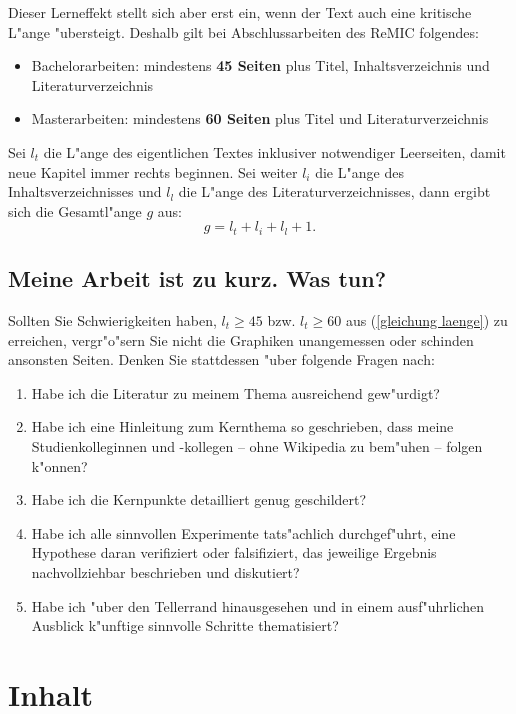 \documentclass[12pt,a4paper,headinclude,twoside, plainheadsepline, open=right,numbers=noenddot]{scrreprt}
\begin{document}
Dieser Lerneffekt stellt sich aber erst ein, wenn der Text auch eine kritische L"ange "ubersteigt.
Deshalb gilt bei Abschlussarbeiten des ReMIC folgendes:
\begin{itemize}
\item Bachelorarbeiten: mindestens \textbf{45 Seiten} plus Titel, Inhaltsverzeichnis und Literaturverzeichnis
\item Masterarbeiten: mindestens \textbf{60 Seiten} plus Titel und Literaturverzeichnis
\end{itemize}
Sei $l_t$ die L"ange des eigentlichen Textes inklusiver notwendiger Leerseiten, damit neue Kapitel immer rechts beginnen.
Sei weiter $l_i$ die L"ange des Inhaltsverzeichnisses und  $l_l$ die L"ange des Literaturverzeichnisses, dann ergibt sich die Gesamtl"ange $g$ aus:
\begin{equation}
g = l_t + l_i + l_l + 1.
\label{gleichung laenge}
\end{equation}

\subsection{Meine Arbeit ist zu kurz. Was tun?}\label{zuKurz}

Sollten Sie Schwierigkeiten haben, $l_t \ge 45$ bzw. $l_t \ge 60$ aus (\ref{gleichung laenge}) zu erreichen, vergr"o"sern Sie nicht die Graphiken unangemessen oder schinden ansonsten Seiten.
Denken Sie stattdessen "uber folgende Fragen nach:
\begin{enumerate}
\item Habe ich die Literatur zu meinem Thema ausreichend gew"urdigt?
\item Habe ich eine Hinleitung zum Kernthema so geschrieben, dass meine Studienkolleginnen und -kollegen -- ohne Wikipedia zu bem"uhen -- folgen k"onnen?
\item Habe ich die Kernpunkte detailliert genug geschildert?
\item Habe ich alle sinnvollen Experimente tats"achlich durchgef"uhrt, eine Hypothese daran verifiziert oder falsifiziert, das jeweilige Ergebnis nachvollziehbar beschrieben und diskutiert?
\item Habe ich "uber den Tellerrand hinausgesehen und in einem ausf"uhrlichen Ausblick k"unftige sinnvolle Schritte thematisiert?
\end{enumerate}

\section{Inhalt}
\label{inhalt}
\end{document}
